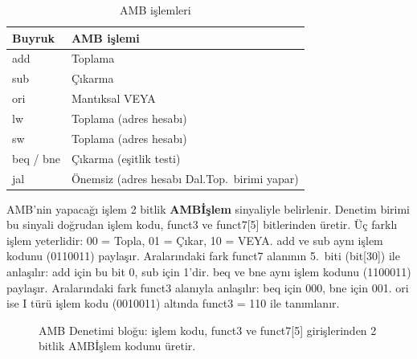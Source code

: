 \begin{table}[htbp]
\centering
\caption{AMB işlemleri}
\label{tab:amb-islemleri}
\begin{tabular}{ll}
\toprule
\textbf{Buyruk} & \textbf{AMB işlemi} \\
\midrule
add & Toplama \\
sub & Çıkarma \\
ori & Mantıksal VEYA \\
lw & Toplama (adres hesabı) \\
sw & Toplama (adres hesabı) \\
beq / bne & Çıkarma (eşitlik testi) \\
jal & Önemsiz (adres hesabı Dal.Top.\ birimi yapar) \\
\bottomrule
\end{tabular}
\end{table}

AMB'nin yapacağı işlem 2 bitlik \textbf{AMBİşlem} sinyaliyle belirlenir. Denetim birimi bu sinyali doğrudan işlem kodu, funct3 ve funct7[5] bitlerinden üretir. Üç farklı işlem yeterlidir: 00 = Topla, 01 = Çıkar, 10 = VEYA. add ve sub aynı işlem kodunu (0110011) paylaşır. Aralarındaki fark funct7 alanının 5.\ biti (bit[30]) ile anlaşılır: add için bu bit 0, sub için 1'dir. beq ve bne aynı işlem kodunu (1100011) paylaşır. Aralarındaki fark funct3 alanıyla anlaşılır: beq için 000, bne için 001. ori ise I türü işlem kodu (0010011) altında funct3 = 110 ile tanımlanır.

\begin{figure}[htbp]
\centering
{}
\caption[AMB Denetimi bloğu]{AMB Denetimi bloğu: işlem kodu, funct3 ve funct7{[5]} girişlerinden 2 bitlik AMBİşlem kodunu üretir.}
\label{fig:amb-denetimi-alt-blok}
\end{figure}

